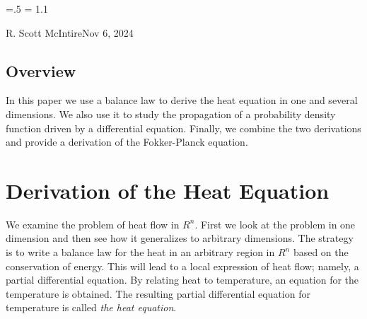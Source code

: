 

\parindent=0pt
\parskip=.5\baselineskip
\baselineskip = 1.1\baselineskip

\footline{\hss\tenrm\folio\hss}

{R. Scott McIntire}{Nov 6, 2024}

\subsection{Overview}

In this paper we use a balance law to derive the heat equation in one and 
several dimensions. We also use it to study the propagation of a probability
density function driven by a differential equation. Finally, we combine the 
two derivations and provide a derivation of the Fokker-Planck equation.


\section{Derivation of the Heat Equation}

We examine the problem of heat flow in $R^n$. First we look at the 
problem in one dimension and then see how it generalizes to arbitrary
dimensions. The strategy is to write a balance law for the heat in 
an arbitrary region in $R^n$ based on the conservation of energy. 
This will lead to a local expression of heat flow;
namely, a partial differential equation. By relating heat to temperature, 
an equation for the temperature is obtained. 
The resulting partial differential equation for temperature is called 
{\it the heat equation\/}.


